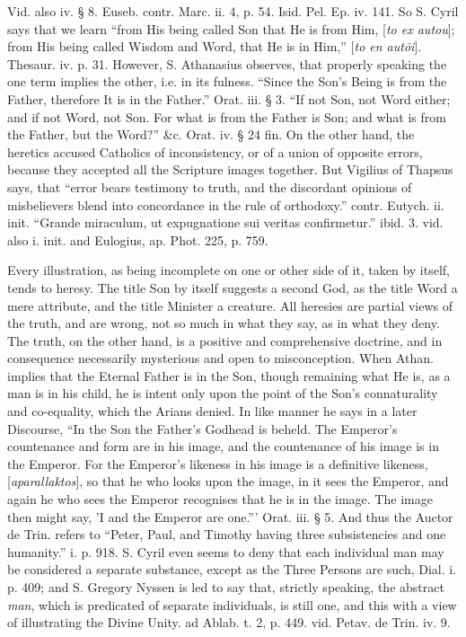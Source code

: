 Vid. also iv. § 8. Euseb. contr. Marc. ii. 4, p.
54. Isid. Pel. Ep. iv. 141. So S. Cyril says that we learn ``from His
being called Son that He is from Him, [\emph{to ex autou}]; from His
being called Wisdom and Word, that He is in Him,'' [\emph{to en aut\={o}i}].
Thesaur. iv. p. 31. However, S. Athanasius observes, that properly
speaking the one term implies the other, i.e. in its fulness. ``Since
the Son's Being is from the Father, therefore It is in the Father.''
Orat. iii. § 3. ``If not Son, not Word either; and if not Word, not
Son. For what is from the Father is Son; and what is from the Father,
but the Word?'' \&c. Orat. iv. § 24 fin. On the other hand, the
heretics accused Catholics of inconsistency, or of a union of opposite
errors, because they accepted all the Scripture images together.
But Vigilius of Thapsus says, that ``error bears testimony to truth,
and the discordant opinions of misbelievers blend into concordance in
the rule of orthodoxy.'' contr. Eutych. ii. init. ``Grande miraculum, ut
expugnatione sui veritas confirmetur.'' ibid. 3. vid. also i. init. and
Eulogius, ap. Phot. 225, p. 759.

Every illustration, as being incomplete on one or
other side of it, taken by itself, tends to heresy. The title Son by
itself suggests a second God, as the title Word a mere attribute, and
the title Minister a creature. All heresies are partial views of the
truth, and are wrong, not so much in what they say, as in what they
deny. The truth, on the other hand, is a positive and comprehensive
doctrine, and in consequence necessarily mysterious and open to
misconception. When Athan. implies that the Eternal Father is in the
Son, though remaining what He is, as a man is in his child, he is
intent only upon the point of the Son's connaturality and co-equality,
which the Arians denied. In like manner he says in a later Discourse, ``In
the Son the Father's Godhead is beheld. The Emperor's countenance and
form are in his image, and the countenance of his image is in the
Emperor. For the Emperor's likeness in his image is a definitive
likeness, [\emph{aparallaktos}], so that he who looks upon the image,
in it sees the Emperor, and again he who sees the Emperor recognises
that he is in the image. The image then might say, 'I and the Emperor
are one.''' Orat. iii. § 5. And thus the Auctor de Trin. refers to ``Peter,
Paul, and Timothy having three subsistencies and one humanity.''
i. p. 918. S. Cyril even seems to deny that each individual man may be
considered a separate substance, except as the Three Persons are such,
Dial. i. p. 409; and S. Gregory Nyssen is led to say that, strictly
speaking, the abstract \emph{man}, which is predicated of separate
individuals, is still one, and this with a view of illustrating the
Divine Unity. ad Ablab. t. 2, p. 449. vid. Petav. de Trin. iv. 9.

